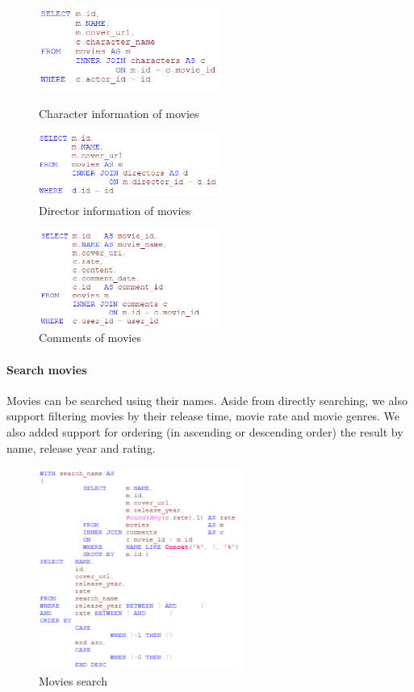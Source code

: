 \begin{CJK*}{UTF8}{gbsn}
\begin{figure}[htbp]
\centering
\begin{minipage}[t]{0.45\textwidth}
\centering
\includegraphics[width=6cm]{m_detail_char.png}
\caption{Character information of movies}
\end{minipage}
\begin{minipage}[t]{0.45\textwidth}
\centering
\includegraphics[width=6cm]{m_detail_dir.png}
\caption{Director information of movies}
\end{minipage}
\end{figure}

\begin{figure}[!htb]
\centering
\includegraphics[width=6cm]{m_detail_com.png}
\caption{Comments of movies}
\end{figure}


\paragraph{Search movies}
Movies can be searched using their names. Aside from directly searching, we also support filtering movies by their release time, movie rate and movie genres. We also added support for ordering (in ascending or descending order) the result by name, release year and rating.
\begin{figure}[htbp]
\centering
\includegraphics[width=0.6\textwidth]{m_search.png}
\caption{Movies search}
\end{figure}


\end{CJK*}
